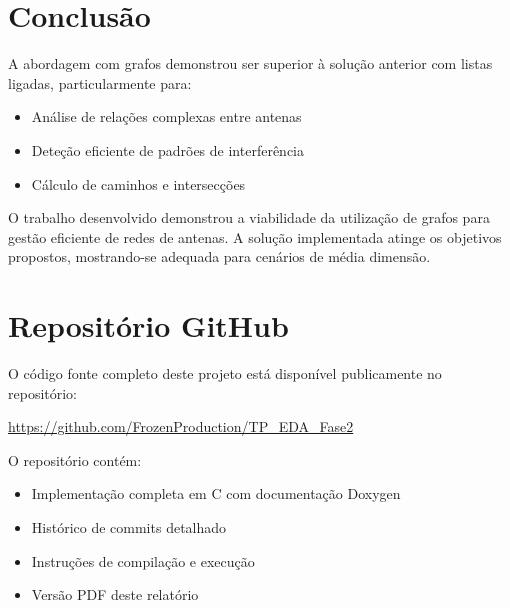 \documentclass[a4paper,12pt]{report}
\begin{document}
\chapter{Conclusão}
A abordagem com grafos demonstrou ser superior à solução anterior com listas ligadas, particularmente para:

\begin{itemize}
    \item Análise de relações complexas entre antenas
    \item Deteção eficiente de padrões de interferência
    \item Cálculo de caminhos e intersecções
\end{itemize}

O trabalho desenvolvido demonstrou a viabilidade da utilização de grafos para gestão eficiente de redes de antenas. A solução implementada atinge os objetivos propostos, mostrando-se adequada para cenários de média dimensão. 

\chapter*{Repositório GitHub}
O código fonte completo deste projeto está disponível publicamente no repositório:

\begin{center}
\url{https://github.com/FrozenProduction/TP_EDA_Fase2}
\end{center}

O repositório contém:
\begin{itemize}
\item Implementação completa em C com documentação Doxygen
\item Histórico de commits detalhado
\item Instruções de compilação e execução
\item Versão PDF deste relatório
\end{itemize}
\end{document}
